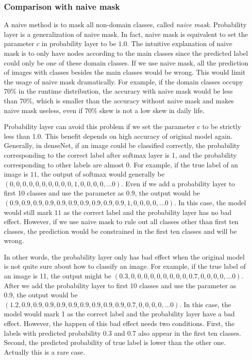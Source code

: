 \documentclass{article}
\begin{document}
\subsubsection{Comparison with naive mask}
A naive method is to mask all non-domain classes, called \textit{naive mask}. Probability layer is a generalization of naive mask. In fact, naive mask is equivalent to set the parameter $c$ in probability layer to be $1.0$. The intuitive explanation of naive mask is to only have nodes according to the main classes since the predicted label could only be one of these domain classes. If we use naive mask, all the prediction of images with classes besides the main classes would be wrong. This would limit the usage of naive mask dramatically. For example, if the domain classes occupy 70\% in the runtime distribution, the accuracy with naive mask would be less than 70\%, which is smaller than the accuracy without naive mask and makes naive mask useless, even if 70\% skew is not a low skew in daily life. 

Probability layer can avoid this problem if we set the parameter c to be strictly less than 1.0. This benefit depends on high accuracy of original model again. Generally, in denseNet, if an image could be classified correctly, the probability corresponding to the correct label after softmax layer is 1, and the probability corresponding to other labels are almost 0. For example, if the true label of an image is $11$, the output of softmax would generally be $(0, 0, 0, 0, 0, 0, 0, 0, 0, 0, 1, 0, 0, 0, 0, ... 0)$. Even if we add a probability layer to first 10 classes and use the parameter as 0.9, the output would be $(0.9, 0.9, 0.9, 0.9, 0.9, 0.9, 0.9, 0.9, 0.9, 0.9, 1, 0, 0, 0, 0, ... 0)$. In this case, the model would still mark $11$ as the correct label and the probability layer has no bad effect. However, if we use naive mask to rule out all classes other than first ten classes, the prediction would be constrained in the first ten classes and will be wrong. 

In other words, the probability layer only has bad effect when the original model is not quite sure about how to classify an image. For example, if the true label of an image is 11, the output might be $(0.3, 0, 0, 0, 0, 0, 0, 0, 0, 0, 0.7, 0, 0, 0, 0, ... 0)$. After we add the probability layer to first 10 classes and use the parameter as 0.9, the output would be $(1.2, 0.9, 0.9, 0.9, 0.9, 0.9, 0.9, 0.9, 0.9, 0.9, 0.7, 0, 0, 0, 0, ... 0)$. In this case, the model would mark 1 as the correct label and the probability layer have a bad effect. However, the happen of this bad effect needs two conditions. First, the labels with predicted probability 0.3 and 0.7 also appear in the first ten classes. Second, the predicted probability of true label is lower than the other one. Actually this is a rare case.
\end{document}
